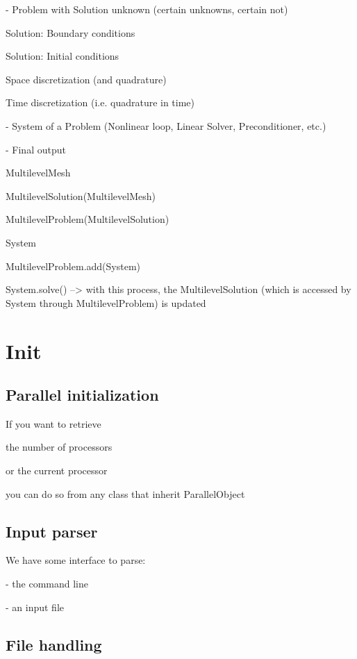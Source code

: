 \documentclass[10pt]{book}
\begin{document}
 - Problem with Solution unknown (certain unknowns, certain not)
 
 Solution: Boundary conditions
 
 Solution: Initial conditions
 
 Space discretization (and quadrature)
 
 Time discretization (i.e. quadrature in time)
 
 - System of a Problem (Nonlinear loop, Linear Solver, Preconditioner, etc.)
 
 - Final output
 
 
 
 

  
  MultilevelMesh
  
  MultilevelSolution(MultilevelMesh)
  
   MultilevelProblem(MultilevelSolution)

   System
   
   MultilevelProblem.add(System)
   
   System.solve() --> with this process, the MultilevelSolution (which is accessed by System through MultilevelProblem) is updated
   
   
 \chapter{Init}

   \section{Parallel initialization}
   
   If you want to retrieve 
   
   the number of processors
   
   or the current processor
   
   you can do so from any class that inherit ParallelObject
   
   
   
   \section{Input parser}
   
   We have some interface to parse:
   
   - the command line
   
   - an input file
   
   
    \section{File handling}
\end{document}
